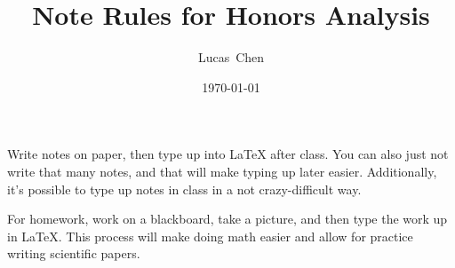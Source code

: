 \documentclass{amsart}
\title{Note Rules for Honors Analysis}
\author{Lucas\ Chen}
\date{\today}
\begin{document}
\maketitle

Write notes on paper, then type up into LaTeX after class. You can also just not write that many notes, and that will make typing up later easier. 
Additionally, it's possible to type up notes in class in a not crazy-difficult way. 

For homework, work on a blackboard, take a picture, and then type the work up in LaTeX. This process will make doing math easier and allow for practice writing scientific papers.
\end{document}
